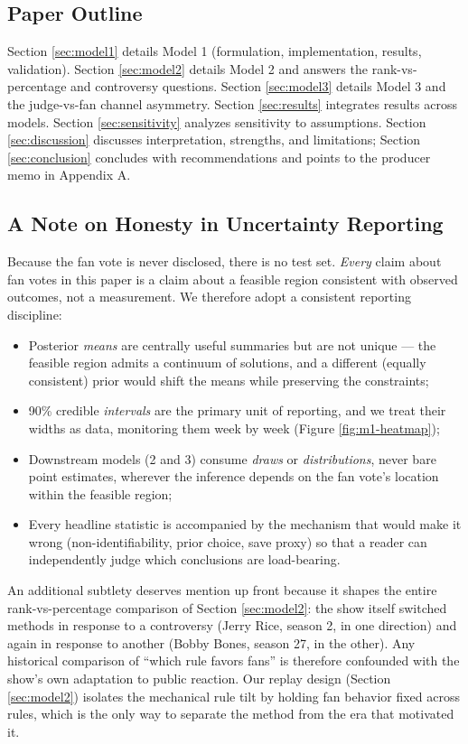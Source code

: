 \documentclass{article}
\begin{document}
\subsection{Paper Outline}

Section \ref{sec:model1} details Model 1 (formulation, implementation, results, validation). Section \ref{sec:model2} details Model 2 and answers the rank-vs-percentage and controversy questions. Section \ref{sec:model3} details Model 3 and the judge-vs-fan channel asymmetry. Section \ref{sec:results} integrates results across models. Section \ref{sec:sensitivity} analyzes sensitivity to assumptions. Section \ref{sec:discussion} discusses interpretation, strengths, and limitations; Section \ref{sec:conclusion} concludes with recommendations and points to the producer memo in Appendix A.

\subsection{A Note on Honesty in Uncertainty Reporting}

Because the fan vote is never disclosed, there is no test set. \emph{Every} claim about fan votes in this paper is a claim about a feasible region consistent with observed outcomes, not a measurement. We therefore adopt a consistent reporting discipline:

\begin{itemize}
  \item Posterior \emph{means} are centrally useful summaries but are not unique --- the feasible region admits a continuum of solutions, and a different (equally consistent) prior would shift the means while preserving the constraints;
  \item 90\% credible \emph{intervals} are the primary unit of reporting, and we treat their widths as data, monitoring them week by week (Figure \ref{fig:m1-heatmap});
  \item Downstream models (2 and 3) consume \emph{draws} or \emph{distributions}, never bare point estimates, wherever the inference depends on the fan vote's location within the feasible region;
  \item Every headline statistic is accompanied by the mechanism that would make it wrong (non-identifiability, prior choice, save proxy) so that a reader can independently judge which conclusions are load-bearing.
\end{itemize}

An additional subtlety deserves mention up front because it shapes the entire rank-vs-percentage comparison of Section \ref{sec:model2}: the show itself switched methods in response to a controversy (Jerry Rice, season 2, in one direction) and again in response to another (Bobby Bones, season 27, in the other). Any historical comparison of ``which rule favors fans'' is therefore confounded with the show's own adaptation to public reaction. Our replay design (Section \ref{sec:model2}) isolates the mechanical rule tilt by holding fan behavior fixed across rules, which is the only way to separate the method from the era that motivated it.
\end{document}
